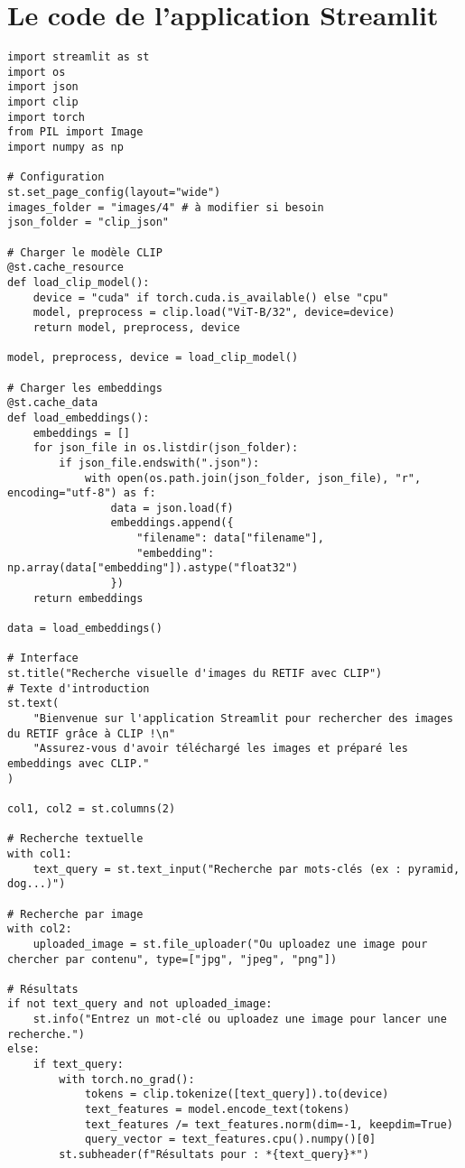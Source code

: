 \section{Le code de l'application Streamlit}
\label{code-streamlit}

\begin{verbatim}
import streamlit as st
import os
import json
import clip
import torch
from PIL import Image
import numpy as np

# Configuration
st.set_page_config(layout="wide")
images_folder = "images/4" # à modifier si besoin
json_folder = "clip_json"

# Charger le modèle CLIP
@st.cache_resource
def load_clip_model():
    device = "cuda" if torch.cuda.is_available() else "cpu"
    model, preprocess = clip.load("ViT-B/32", device=device)
    return model, preprocess, device

model, preprocess, device = load_clip_model()

# Charger les embeddings
@st.cache_data
def load_embeddings():
    embeddings = []
    for json_file in os.listdir(json_folder):
        if json_file.endswith(".json"):
            with open(os.path.join(json_folder, json_file), "r", encoding="utf-8") as f:
                data = json.load(f)
                embeddings.append({
                    "filename": data["filename"],
                    "embedding": np.array(data["embedding"]).astype("float32")
                })
    return embeddings

data = load_embeddings()

# Interface
st.title("Recherche visuelle d'images du RETIF avec CLIP")
# Texte d'introduction
st.text(
    "Bienvenue sur l'application Streamlit pour rechercher des images du RETIF grâce à CLIP !\n"
    "Assurez-vous d'avoir téléchargé les images et préparé les embeddings avec CLIP."
)

col1, col2 = st.columns(2)

# Recherche textuelle
with col1:
    text_query = st.text_input("Recherche par mots-clés (ex : pyramid, dog...)")

# Recherche par image
with col2:
    uploaded_image = st.file_uploader("Ou uploadez une image pour chercher par contenu", type=["jpg", "jpeg", "png"])

# Résultats
if not text_query and not uploaded_image:
    st.info("Entrez un mot-clé ou uploadez une image pour lancer une recherche.")
else:
    if text_query:
        with torch.no_grad():
            tokens = clip.tokenize([text_query]).to(device)
            text_features = model.encode_text(tokens)
            text_features /= text_features.norm(dim=-1, keepdim=True)
            query_vector = text_features.cpu().numpy()[0]
        st.subheader(f"Résultats pour : *{text_query}*")


\end{verbatim}
